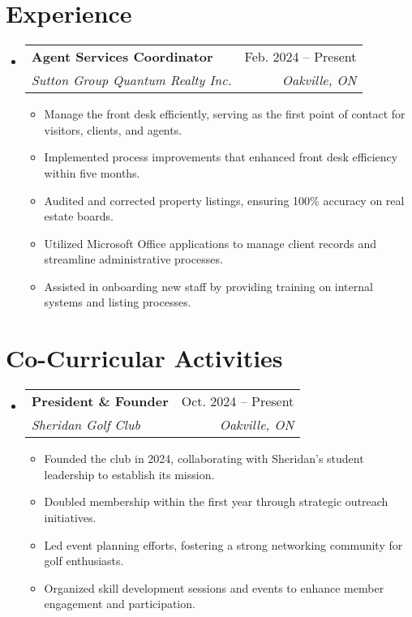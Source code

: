 \documentclass[letterpaper,11pt]{article}
\makeatletter
\newcommand{\resumeItem}[1]{
  \item\small{
    {#1 \vspace{-2pt}}
  }
}
\newcommand{\resumeSubheading}[4]{
  \vspace{-2pt}\item
    \begin{tabular*}{0.97\textwidth}[t]{l@{\extracolsep{\fill}}r}
      \textbf{#1} & #2 \\
      \textit{\small#3} & \textit{\small #4} \\
    \end{tabular*}\vspace{-7pt}
}
\newcommand{\resumeSubHeadingListStart}{\begin{itemize}[leftmargin=0.15in, label={}]}
\newcommand{\resumeSubHeadingListEnd}{\end{itemize}}
\newcommand{\resumeItemListStart}{\begin{itemize}}
\newcommand{\resumeItemListEnd}{\end{itemize}\vspace{-5pt}}
\makeatother
\begin{document}
\section{Experience}
\resumeSubHeadingListStart

    \resumeSubheading
        { Agent Services Coordinator }
        { Feb. 2024 – Present }
        { Sutton Group Quantum Realty Inc. }
        { Oakville, ON }
    \resumeItemListStart
        
            \resumeItem{ Manage the front desk efficiently, serving as the first point of contact for visitors, clients, and agents. }
        
            \resumeItem{ Implemented process improvements that enhanced front desk efficiency within five months. }
        
            \resumeItem{ Audited and corrected property listings, ensuring 100\% accuracy on real estate boards. }
        
            \resumeItem{ Utilized Microsoft Office applications to manage client records and streamline administrative processes. }
        
            \resumeItem{ Assisted in onboarding new staff by providing training on internal systems and listing processes. }
        
    \resumeItemListEnd

\resumeSubHeadingListEnd



\section{Co-Curricular Activities}
\resumeSubHeadingListStart

    \resumeSubheading
        { President \& Founder }
        { Oct. 2024 – Present }
        { Sheridan Golf Club }
        { Oakville, ON }
    \resumeItemListStart
        
            \resumeItem{ Founded the club in 2024, collaborating with Sheridan’s student leadership to establish its mission. }
        
            \resumeItem{ Doubled membership within the first year through strategic outreach initiatives. }
        
            \resumeItem{ Led event planning efforts, fostering a strong networking community for golf enthusiasts. }
        
            \resumeItem{ Organized skill development sessions and events to enhance member engagement and participation. }
        
    \resumeItemListEnd

\resumeSubHeadingListEnd
\end{document}
